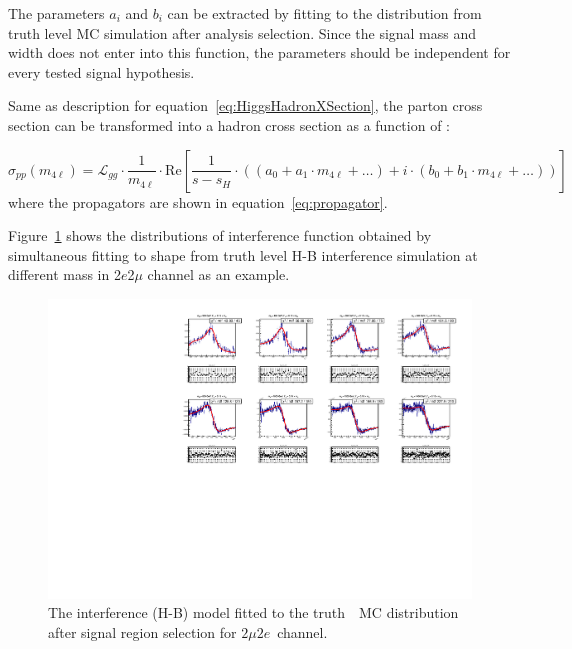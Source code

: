 The parameters $a_i$ and $b_i$ can be extracted by fitting to the \mfl distribution from truth level MC simulation after analysis selection.
Since the signal mass and width does not enter into this function, the parameters should be independent for every tested signal hypothesis.

Same as description for equation~\ref{eq:HiggsHadronXSection}, the parton cross section can be transformed into a hadron cross section as a function of \mfl:

\begingroup
\small
\begin{equation} \label{eq:HBHadronXSection}
    \sigma_{pp} (m_{4\ell}) = \mathcal{L}_{gg} \cdot \frac{1}{m_{4\ell}} \cdot \mathrm{Re} \left [   \frac{1}{s-s_H}  \cdot  \left ( (a_0 + a_1 \cdot m_{4\ell} + \dots) + i \cdot (b_0 + b_1 \cdot m_{4\ell} + \dots) \right )\right ]
\end{equation}
\endgroup
where the propagators are shown in equation~\ref{eq:propagator}.

Figure~\ref{fig:HB_Int_2mu2e} shows the distributions of interference function obtained by simultaneous fitting to \mfl shape from truth level H-B interference simulation at different mass in 2$e$2$\mu$ channel as an example.

\begingroup
\small
\begin{figure}[!htbp]
    \centering
    \includegraphics[width=1.\textwidth]{figures/HMHZZ/signal/Interference/HB_Int_2mu2e.pdf}
    \caption{The interference (H-B) model fitted to the truth~\mfl~MC distribution after signal region selection for $2\mu2e$~channel. \label{fig:HB_Int_2mu2e} }
\end{figure}
\endgroup

